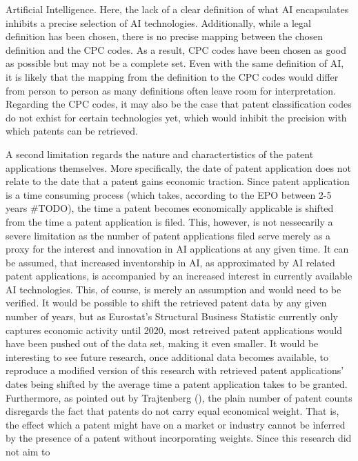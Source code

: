 \documentclass[
  11,
  a4paperpaper,
]{article}
\begin{document}
Artificial Intelligence. Here, the lack of a clear definition of what AI
encapsulates inhibits a precise selection of AI technologies.
Additionally, while a legal definition has been chosen, there is no
precise mapping between the chosen definition and the CPC codes. As a
result, CPC codes have been chosen as good as possible but may not be a
complete set. Even with the same definition of AI, it is likely that the
mapping from the definition to the CPC codes would differ from person to
person as many definitions often leave room for interpretation.
Regarding the CPC codes, it may also be the case that patent
classification codes do not exhist for certain technologies yet, which
would inhibit the precision with which patents can be retrieved.

A second limitation regards the nature and charactertistics of the
patent applications themselves. More specifically, the date of patent
application does not relate to the date that a patent gains economic
traction. Since patent application is a time consuming process (which
takes, according to the EPO between 2-5 years \#TODO), the time a patent
becomes economically applicable is shifted from the time a patent
application is filed. This, however, is not nessecarily a severe
limitation as the number of patent applications filed serve merely as a
proxy for the interest and innovation in AI applications at any given
time. It can be assumed, that increased inventorship in AI, as
approximated by AI related patent applications, is accompanied by an
increased interest in currently available AI technologies. This, of
course, is merely an assumption and would need to be verified. It would
be possible to shift the retrieved patent data by any given number of
years, but as Eurostat's Structural Business Statistic currently only
captures economic activity until 2020, most retreived patent
applications would have been pushed out of the data set, making it even
smaller. It would be interesting to see future research, once additional
data becomes available, to reproduce a modified version of this research
with retrieved patent applications' dates being shifted by the average
time a patent application takes to be granted. Furthermore, as pointed
out by Trajtenberg (), the
plain number of patent counts disregards the fact that patents do not
carry equal economical weight. That is, the effect which a patent might
have on a market or industry cannot be inferred by the presence of a
patent without incorporating weights. Since this research did not aim to
\end{document}
